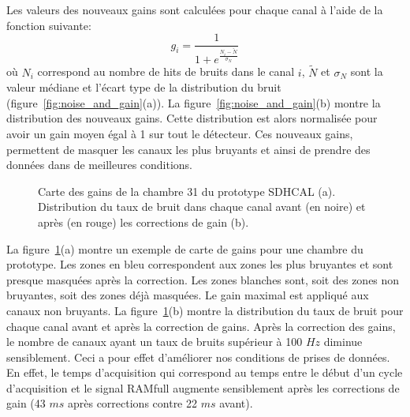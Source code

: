 Les valeurs des nouveaux gains sont calculées pour chaque canal à l'aide de la fonction suivante:
\begin{equation}
  g_i=\frac{1}{1+e^{\frac{N_i-\tilde{N}}{\sigma_N}}}
  \label{eq.new_gain}
\end{equation}
où $N_i$ correspond au nombre de hits de bruits dans le canal $i$, $\tilde N$ et $\sigma_N$ sont la valeur médiane et l'écart type de la distribution du bruit (figure~\ref{fig:noise_and_gain}(a)). La figure~\ref{fig:noise_and_gain}(b) montre la distribution des nouveaux gains. Cette distribution est alors normalisée pour avoir un gain moyen égal à 1 sur tout le détecteur. Ces nouveaux gains, permettent de masquer les canaux les plus bruyants et ainsi de prendre des données dans de meilleures conditions. 
\begin{figure}[!ht]
  \caption{Carte des gains de la chambre 31 du prototype SDHCAL (a). Distribution du taux de bruit dans chaque canal avant (en noire) et après (en rouge) les corrections de gain (b).\label{fig:map_and_rate}}
\end{figure}
La figure~\ref{fig:map_and_rate}(a) montre un exemple de carte de gains pour une chambre du prototype. Les zones en bleu correspondent aux zones les plus bruyantes et sont presque masquées après la correction. Les zones blanches sont, soit des zones non bruyantes, soit des zones déjà masquées. Le gain maximal est appliqué aux canaux non bruyants. La figure~\ref{fig:map_and_rate}(b) montre la distribution du taux de bruit pour chaque canal avant et après la correction de gains. Après la correction des gains, le nombre de canaux ayant un taux de bruits supérieur à 100 $Hz$ diminue sensiblement. Ceci a pour effet d'améliorer nos conditions de prises de données. En effet, le temps d'acquisition qui correspond au temps entre le début d'un cycle d'acquisition et le signal RAMfull augmente sensiblement après les corrections de gain (43 $ms$ après corrections contre 22 $ms$ avant). 

